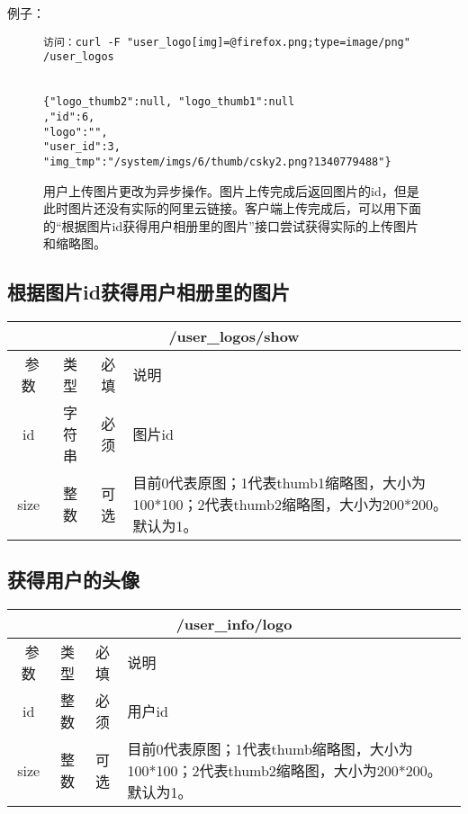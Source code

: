 \documentclass[cs4size]{ctexartutf8}
\begin{document}
例子：

\begin{figure}[H]
\begin{verbatim}
访问：curl -F "user_logo[img]=@firefox.png;type=image/png" 
/user_logos


{"logo_thumb2":null, "logo_thumb1":null
,"id":6,
"logo":"",
"user_id":3,
"img_tmp":"/system/imgs/6/thumb/csky2.png?1340779488"}

\end{verbatim}

用户上传图片更改为异步操作。图片上传完成后返回图片的id，但是此时图片还没有实际的阿里云链接。客户端上传完成后，可以用下面的“根据图片id获得用户相册里的图片”接口尝试获得实际的上传图片和缩略图。

\end{figure}


\subsection{根据图片id获得用户相册里的图片}
\begin{table}[H]
   \begin{center}
\begin{tabular}{|c|c|c|p{12cm}|}
\hline
\multicolumn{4}{|c|}{/user\_logos/show} \\
\hline\hline
 \  参数  & 类型 & 必填 &  说明  \\
  \hline
 id  & 字符串 & 必须 & 图片id\\
\hline
 size  & 整数 & 可选 &  目前0代表原图；1代表thumb1缩略图，大小为100*100；2代表thumb2缩略图，大小为200*200。默认为1。\\ 
\hline
\end{tabular}
   \end{center}
\end{table}



\subsection{获得用户的头像}

\begin{table}[H]
   \begin{center}
\begin{tabular}{|c|c|c|p{12cm}|}
\hline
\multicolumn{4}{|c|}{/user\_info/logo} \\
\hline\hline
 \  参数  & 类型 & 必填 &  说明  \\
\hline
 id  & 整数 & 必须 &  用户id\\
\hline
 size  & 整数 & 可选 &  目前0代表原图；1代表thumb缩略图，大小为100*100；2代表thumb2缩略图，大小为200*200。默认为1。\\ 
\hline
\end{tabular}
   \end{center}
\end{table}
\end{document}
